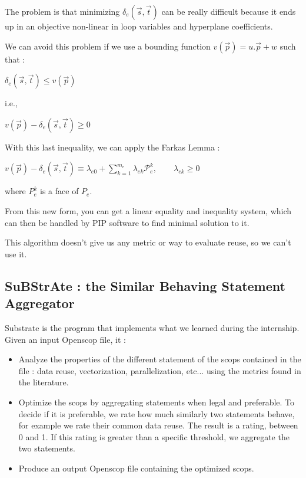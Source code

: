 \documentclass[paper=a4, fontsize=11pt]{scrartcl}
\numberwithin{equation}{section}        %
\numberwithin{figure}{section}          %
\numberwithin{table}{section}               %
\begin{document}
            The problem is that minimizing $\delta_e\left(\vec{s},\vec{t}\right)$
            can be really difficult because it ends up in an objective non-linear
            in loop variables and hyperplane coefficients.

            We can avoid this problem if we use a bounding function $v(\vec{p}) = u.\vec{p} + w$ such that :
            \begin{center}
                $\delta_e\left(\vec{s},\vec{t}\right) \leq v(\vec{p})$
            \end{center}
            i.e.,
            \begin{center}
                $v(\vec{p}) - \delta_e\left(\vec{s},\vec{t}\right) \geq 0$
            \end{center}

            With this last inequality, we can apply the Farkas Lemma :
            \begin{center}
                $v(\vec{p}) - \delta_e\left(\vec{s},\vec{t}\right) \equiv \lambda_{e0}
                + \sum\limits_{k=1}^{m_e}{\lambda_{ek}\mathcal{P}_{e}^k},\qquad \lambda_{ek} \geq 0$
            \end{center}
            where $P_e^k$ is a face of $P_e$.

            From this new form, you can get a linear equality and inequality system,
            which can then be handled by PIP software to find minimal solution to it.

            This algorithm doesn't give us any metric or way to evaluate reuse, so
            we can't use it.

    \subsection{SuBStrAte : the Similar Behaving Statement Aggregator}
        Substrate is the program that implements what we learned during the internship.
        Given an input Openscop file, it :
        \begin{itemize}
            \item Analyze the properties of the different statement of the scops
                contained in the file : data reuse, vectorization, parallelization, etc...
                using the metrics found in the literature.
            \item Optimize the scops by aggregating statements when legal and preferable.
                To decide if it is preferable, we rate how much similarly two statements
                behave, for example we rate their common data reuse. The result is a rating,
                between 0 and 1. If this rating is greater than a specific threshold, we
                aggregate the two statements.
            \item Produce an output Openscop file containing the optimized scops.
        \end{itemize}
\end{document}
